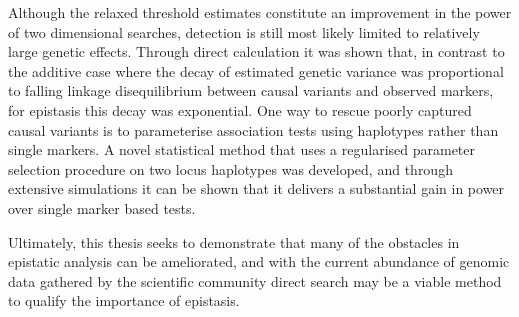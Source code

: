 \documentclass[a4paper, 11pt, oneside]{Thesis}
\begin{document}
{{Although the relaxed threshold estimates constitute an improvement in the power of two dimensional searches, detection is still most likely limited to relatively large genetic effects. Through direct calculation it was shown that, in contrast to the additive case where the decay of estimated genetic variance was proportional to falling linkage disequilibrium between causal variants and observed markers, for epistasis this decay was exponential. One way to rescue poorly captured causal variants is to parameterise association tests using haplotypes rather than single markers. A novel statistical method that uses a regularised parameter selection procedure on two locus haplotypes was developed, and through extensive simulations it can be shown that it delivers a substantial gain in power over single marker based tests.

Ultimately, this thesis seeks to demonstrate that many of the obstacles in epistatic analysis can be ameliorated, and with the current abundance of genomic data gathered by the scientific community direct search may be a viable method to qualify the importance of epistasis.
}}
\clearpage


\end{document}

